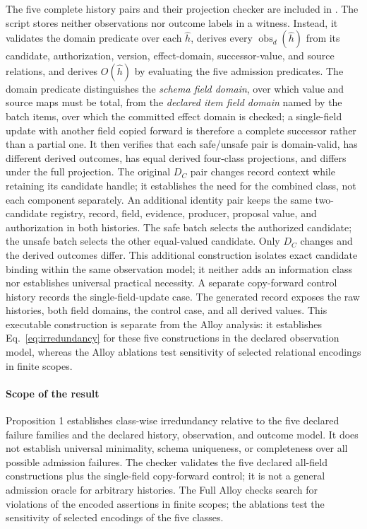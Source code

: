 The five complete history pairs and their projection checker are included in . The script stores neither observations nor outcome labels in a witness. Instead, it validates the domain predicate over each $\widehat h$, derives every $\operatorname{obs}_d(\widehat h)$ from its candidate, authorization, version, effect-domain, successor-value, and source relations, and derives $O(\widehat h)$ by evaluating the five admission predicates. The domain predicate distinguishes the \emph{schema field domain}, over which value and source maps must be total, from the \emph{declared item field domain} named by the batch items, over which the committed effect domain is checked; a single-field update with another field copied forward is therefore a complete successor rather than a partial one. It then verifies that each safe/unsafe pair is domain-valid, has different derived outcomes, has equal derived four-class projections, and differs under the full projection. The original $D_C$ pair changes record context while retaining its candidate handle; it establishes the need for the combined class, not each component separately. An additional identity pair keeps the same two-candidate registry, record, field, evidence, producer, proposal value, and authorization in both histories. The safe batch selects the authorized candidate; the unsafe batch selects the other equal-valued candidate. Only $D_C$ changes and the derived outcomes differ. This additional construction isolates exact candidate binding within the same observation model; it neither adds an information class nor establishes universal practical necessity. A separate copy-forward control history records the single-field-update case. The generated record  exposes the raw histories, both field domains, the control case, and all derived values. This executable construction is separate from the Alloy analysis: it establishes Eq.~\eqref{eq:irredundancy} for these five constructions in the declared observation model, whereas the Alloy ablations test sensitivity of selected relational encodings in finite scopes.

\paragraph{Scope of the result}
Proposition 1 establishes class-wise irredundancy relative to the five declared failure families and the declared history, observation, and outcome model. It does not establish universal minimality, schema uniqueness, or completeness over all possible admission failures. The checker validates the five declared all-field constructions plus the single-field copy-forward control; it is not a general admission oracle for arbitrary histories. The Full Alloy checks search for violations of the encoded assertions in finite scopes; the ablations test the sensitivity of selected encodings of the five classes.

